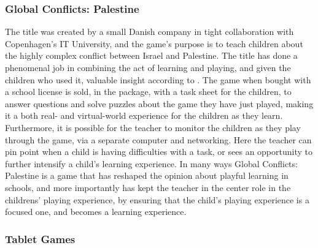 \subsubsection{Global Conflicts: Palestine}

The title was created by a small Danish company in tight collaboration with Copenhagen's IT University, and the game's purpose is to teach children about the highly complex conflict between Israel and Palestine. The title has done a phenomenal job in combining the act of learning and playing, and given the children who used it, valuable insight according to \cite{laeringpaaspil}. The game when bought with a school license is sold, in the package, with a task sheet for the children, to answer questions and solve puzzles about the game they have just played, making it a both 
real- and virtual-world experience for the children as they learn. Furthermore, it is possible for the teacher to monitor the children as they play through the game, via a separate computer and networking. Here the teacher can pin point when a child is having difficulties with a task, or sees an opportunity to further intensify a child's learning experience. In many ways Global Conflicts: Palestine is a game that has reshaped the opinion about playful learning in schools, and more importantly has kept the teacher in the center role in the childrens' playing experience, by ensuring that the child's playing experience is a focused one, and becomes a learning experience.\cite{laeringpaaspil}

\subsubsection{Tablet Games}

